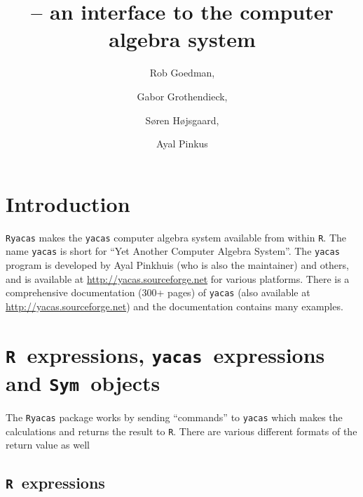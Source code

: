 \documentclass[]{article}
\title{\ryacas{} -- an \rlan{} interface to the \yacas{} computer
  algebra system}
\author{Rob Goedman, \and
Gabor Grothendieck,  \and
Søren Højsgaard,  \and
Ayal Pinkus}
\newcommand{\rlan}{{\tt R}}
\newcommand{\ryacas}{{\tt Ryacas}}
\newcommand{\yacas}{{\tt yacas}}
\def\R{\texttt{R}}
\def\sym{\texttt{Sym}}
\begin{document}
\maketitle
\tableofcontents
\parskip5pt


\renewenvironment{Schunk}{\begin{center}
    \small
    \begin{boxedminipage}{0.95\textwidth}}{
    \end{boxedminipage}\end{center}}



\section{Introduction} 
\label{sec:introduction}

\ryacas{} makes the \yacas{} computer algebra system available from
within \rlan. The name \yacas{} is short for ``Yet Another Computer Algebra
System''. The \yacas{} program 
is developed by Ayal Pinkhuis (who is also the maintainer)
and others, and is available at
\href{http://yacas.sourceforge.net}{http://yacas.sourceforge.net} for various
platforms. There is a comprehensive documentation (300+ pages) of
\yacas{} (also available at
\href{http://yacas.sourceforge.net}{http://yacas.sourceforge.net}) and the
documentation contains many examples.




\section{\R\ expressions,  \yacas\ expressions and \sym\ objects} 
\label{sec:hood}

The \ryacas{} package works by sending ``commands''
to \yacas{} which makes the calculations and returns the result
to \R{}. There are various different formats of the return value as well

\subsection{\R\ expressions}
\end{document}
